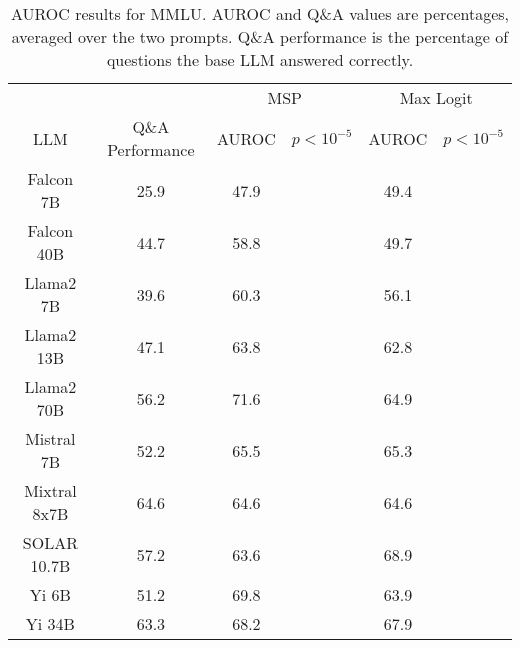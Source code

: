 \begin{table*}
\centering
\begin{tabular}{c|c|c|c|c|c}
& & \multicolumn{2}{c|}{MSP} & \multicolumn{2}{c}{Max Logit} \\ 
LLM & Q\&A Performance & AUROC & $p < 10^{-5}$ & AUROC & $p < 10^{-5}$\\ \hline
Falcon 7B & 25.9 & 47.9 &  & 49.4 & \\
Falcon 40B & 44.7 & 58.8 &  & 49.7 & \\
Llama2 7B & 39.6 & 60.3 &  & 56.1 & \\
Llama2 13B & 47.1 & 63.8 &  & 62.8 & \\
Llama2 70B & 56.2 & 71.6 &  & 64.9 & \\
Mistral 7B & 52.2 & 65.5 &  & 65.3 & \\
Mixtral 8x7B & 64.6 & 64.6 &  & 64.6 & \\
SOLAR 10.7B & 57.2 & 63.6 &  & 68.9 & \\
Yi 6B & 51.2 & 69.8 &  & 63.9 & \\
Yi 34B & 63.3 & 68.2 &  & 67.9 & \\
\hline
\end{tabular}
\caption{AUROC results for MMLU. AUROC and Q\&A values are percentages, averaged over the two prompts. Q\&A performance is the percentage of questions the base LLM answered correctly.}
\label{tab:mmlu_auroc}
\end{table*}
